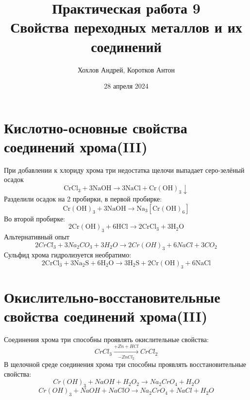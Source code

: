 \documentclass[a4paper,12pt]{article}
\author{Хохлов Андрей, Коротков Антон}
\title{Практическая работа 9 \\
	\textbf{Свойства переходных металлов и их соединений}}
\date{28 апреля 2024}
\begin{document}
{\Large \maketitle}
\section{Кислотно-основные свойства соединений хрома(III)}
При добавлении к хлориду хрома три недостатка щелочи выпадает серо-зелёный осадок
\begin{equation} 
\mathrm{CrCl_3 + 3NaOH \longrightarrow 3NaCl + Cr(OH)_3 \downarrow } 
\end{equation}
Разделили осадок на 2 пробирки, в первой пробирке:
\begin{equation} 
\mathrm{Cr(OH)_3 + 3NaOH \longrightarrow Na_3[Cr(OH)_6]  } 
\end{equation}
Во второй пробирке:
\begin{equation} 
\mathrm{2Cr(OH)_3 + 6HCl \longrightarrow  2CrCl_3 + 3H_2O}
\end{equation}
Альтернативный опыт
\begin{equation} 
2CrCl_3 + 3Na_2 CO_3 + 3H_2O \longrightarrow 2Cr(OH)_3 + 6NaCl + 3CO_2
\end{equation}
Сульфид хрома гидролизуется необратимо:
\begin{equation} 
\mathrm{2CrCl_3 + 3Na_2S + 6H_2O \longrightarrow 3H_2S + 2Cr(OH)_3 + 6NaCl }
\end{equation}
\section{Окислительно-восстановительные свойства соединений хрома(III)} 
Соединения хрома три способны проявлять окислительные свойства:
\begin{equation}
    CrCl_3 \xrightarrow[- ZnCl_2]{+Zn + HCl} CrCl_2
\end{equation}
В щелочной среде соединения хрома три способны проявлять восстановительные свойства:
\begin{equation}
    Cr(OH)_3 + NaOH + H_2O_2 \longrightarrow Na_2CrO_4 + H_2O
\end{equation}
\begin{equation}
    Cr(OH)_3 + NaOH + NaClO \longrightarrow Na_2CrO_4 + NaCl + H_2O
\end{equation}
\end{document}
